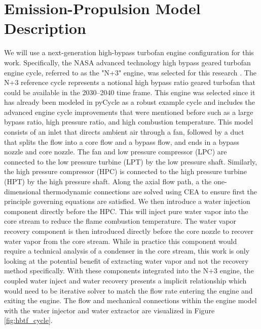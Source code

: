 \documentclass[conf]{new-aiaa}
\begin{document}
\section{Emission-Propulsion Model Description}
\label{sec:epModel}
We will use a next-generation high-bypass turbofan engine configuration for this work.
Specifically, the NASA advanced technology high bypass geared turbofan engine cycle, referred to as the "N+3" engine, was selected for this research \cite[]{Hendricks2019}. The N+3 reference cycle represents a notional high bypass ratio geared turbofan that could be available in the 2030–2040 time frame.
This engine was selected since it has already been modeled in pyCycle as a robust example cycle and includes the advanced engine cycle improvements that were mentioned before such as a large bypass ratio, high pressure ratio, and high combustion temperature.
This model consists of an inlet that directs ambient air through a fan, followed by a duct that splits the flow into a core flow and a bypass flow, and ends in a bypass nozzle and core nozzle. The fan and low pressure compressor (LPC) are connected to the low pressure turbine (LPT) by the low pressure shaft.
Similarly, the high pressure compressor (HPC) is connected to the high pressure turbine (HPT) by the high pressure shaft. Along the axial flow path, a the one-dimensional thermodynamic connections are solved using CEA to ensure first the principle governing equations are satisfied.
We then introduce a water injection component directly before the HPC.
This will inject pure water vapor into the core stream to reduce the flame combustion temperature.
The water vapor recovery component is then introduced directly before the core nozzle to recover water vapor from the core stream.
While in practice this component would require a technical analysis of a condenser in the core stream, this work is only looking at the potential benefit of extracting water vapor and not the recovery method specifically.
With these components integrated into the N+3 engine, the coupled water inject and water recovery presents a implicit relationship which would need to be iterative solver to match the flow rate entering the engine and exiting the engine.
The flow and mechanical connections within the engine model with the water injector and water extractor are visualized in Figure \ref{fig:hbtf_cycle}.
\end{document}
